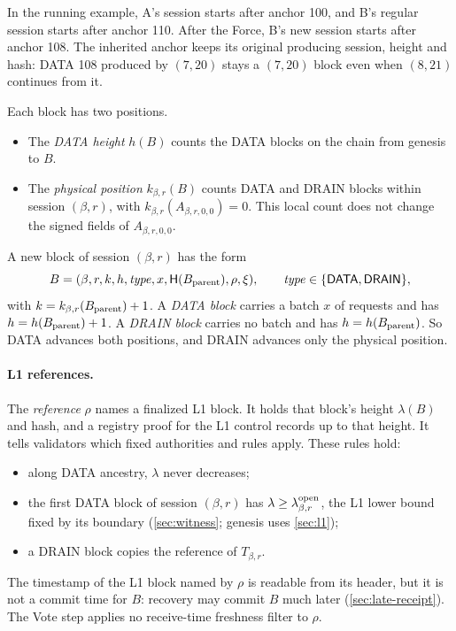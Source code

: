 \documentclass[11pt,a4paper]{article}
\newcommand{\Hash}{\mathsf H}
\newcommand{\tagg}[1]{\ensuremath{\mathsf{#1}}}
\newcommand{\defterm}[1]{\textcolor{rrBlue}{\textit{#1}}}
\begin{document}
In the running example, A's session starts after anchor 100, and B's
regular session starts after anchor 110. After the Force, B's new session
starts after anchor 108. The inherited anchor keeps its original
producing session, height and hash: DATA 108 produced by $(7,20)$ stays
a $(7,20)$ block even when $(8,21)$ continues from it.

Each block has two positions.
\begin{itemize}
\item The \defterm{DATA height} $h(B)$ counts the DATA blocks on the chain
from genesis to $B$.
\item The \defterm{physical position} $k_{\beta,r}(B)$ counts DATA and DRAIN
blocks within session $(\beta,r)$, with $k_{\beta,r}(A_{\beta,r,0,0})=0$.
This local count does not change the signed fields of $A_{\beta,r,0,0}$.
\end{itemize}
A new block of session $(\beta,r)$ has the form
\[
 B=(\beta,r,k,h,\mathit{type},x,\Hash(B_{\rm parent}),\rho,\xi),
 \qquad \mathit{type}\in\{\tagg{DATA},\tagg{DRAIN}\},
\]
with $k=k_{\beta,r}(B_{\rm parent})+1$. A \defterm{DATA block} carries a
batch $x$ of requests and has $h=h(B_{\rm parent})+1$. A \defterm{DRAIN
block} carries no batch and has $h=h(B_{\rm parent})$. So DATA advances
both positions, and DRAIN advances only the physical position.

\paragraph{L1 references.}
The \defterm{reference} $\rho$ names a finalized L1 block. It holds that
block's height $\lambda(B)$ and hash, and a registry proof for the L1
control records up to that height. It tells validators which fixed
authorities and rules apply. These rules hold:
\begin{itemize}
\item along DATA ancestry, $\lambda$ never decreases;
\item the first DATA block of session $(\beta,r)$ has $\lambda\ge
\lambda^{\rm open}_{\beta,r}$, the L1 lower bound fixed by its boundary
(\cref{sec:witness}; genesis uses \cref{sec:l1});
\item a DRAIN block copies the reference of $T_{\beta,r}$.
\end{itemize}
The timestamp of the L1 block named by $\rho$ is readable from its
header, but it is not a commit time for $B$: recovery may commit $B$
much later (\cref{sec:late-receipt}). The Vote step applies no
receive-time freshness filter to $\rho$.
\end{document}
